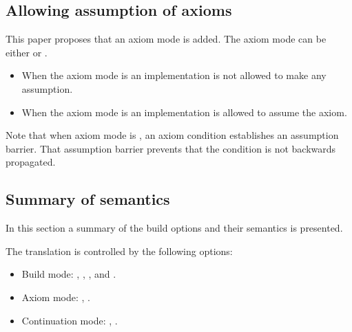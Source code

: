 \subsection{Allowing assumption of axioms}

This paper proposes that an axiom mode is added. The axiom mode can be either
 or .

\begin{itemize}
  \item When the axiom mode is  an implementation is not
        allowed to make any assumption.
  \item When the axiom mode is  an implementation is
        allowed to assume the axiom.
\end{itemize}

Note that when axiom mode is , an axiom condition establishes
an assumption barrier. That assumption barrier prevents that the condition
is not backwards propagated.

\subsection{Summary of semantics}

In this section a summary of the build options and their semantics is presented.

The translation is controlled by the following options:

\begin{itemize}
  \item Build mode: , , , and .
  \item Axiom mode: , .
  \item Continuation mode: , .
\end{itemize}

